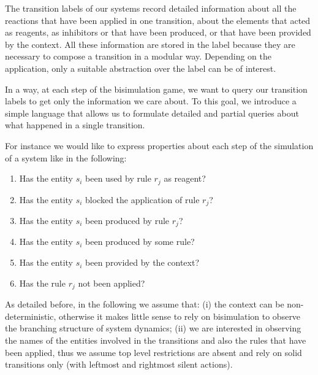 The transition labels of our systems record detailed information about all the reactions that have been applied in one transition, about the elements that acted as reagents, as inhibitors or that have been produced, or that have been provided by the context.
All these information are stored in the label because they are necessary to compose a transition in a modular way. Depending on the application, only a suitable abstraction over the label can be of interest.

In a way, at each step of the bisimulation game, we want to query our transition labels to get only the information we care about.
To this goal, we introduce a simple language
that allows us to formulate detailed and partial queries about what happened in a single transition.

For instance we would like to express properties about each step of the simulation of a system like in the following:

\begin{example} \label{properties_ex}
\begin{enumerate}
\item Has the entity $s_i$ been used by rule $r_j$ as reagent?
\item Has the entity $s_i$ blocked the application of  rule $r_j$?
\item Has the entity $s_i$ been produced by rule $r_j$?
\item Has the entity $s_i$ been produced by some rule?
\item Has the entity $s_i$ been provided by the context? 
\item Has the rule $r_j$ not been applied? 
\end{enumerate}
\end{example}

As detailed before, in the following we assume that: (i) the context can be non-deterministic, otherwise it makes little sense to rely on bisimulation to observe the branching structure of system dynamics; (ii) we are interested in observing the names of the entities involved in the transitions and also the rules that have been applied, thus we assume top level restrictions are absent and rely on solid transitions only (with leftmost and rightmost silent actions).

